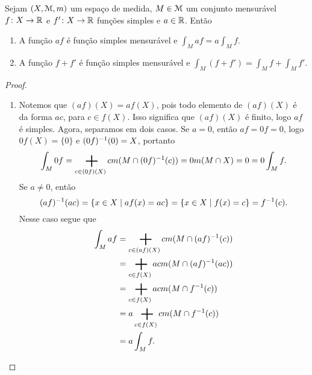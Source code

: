 \begin{proposition}
Sejam $(X,\mathcal{M},m)$ um espaço de medida, $M \in \mathcal{M}$ um conjunto mensurável $f\colon X \to \mathbb{R}$ e $f'\colon X \to \mathbb{R}$ funções simples e $a \in \mathbb{R}$. Então
	\begin{enumerate}
	\item A função $af$ é função simples mensurável e $\displaystyle\int_M af = a\int_M f$.
	\item A função $f+f'$ é função simples mensurável e $\displaystyle\int_M (f+f') = \int_M f + \int_M f'$.
	\end{enumerate}
\end{proposition}
\begin{proof}
\begin{enumerate}
	\item Notemos que $(af)(X) = af(X)$, pois todo elemento de $(af)(X)$ é da forma $ac$, para $c \in f(X)$. Isso significa que $(af)(X)$ é finito, logo $af$ é simples. Agora, separamos em dois casos. Se $a=0$, então $af=0f=0$, logo $0f(X)=\{0\}$ e $(0f)^{-1}(0)=X$, portanto
	\begin{equation*}
	\int_M 0f = \sum_{c \in (0f)(X)} c \med(M \cap (0f)\inv(c)) = 0 \med(M \cap X) = 0 = 0\int_M f.
	\end{equation*}
Se $a \neq 0$, então
	\begin{equation*}
	(af)^{-1}(ac) = \left\{{x \in X}\;\middle\vert\;{af(x)=ac}\right\} = \left\{{x \in X}\;\middle\vert\;{f(x)=c}\right\} = f^{-1}(c).
	\end{equation*}
	Nesse caso segue que
	\begin{align*}
	\int_M af &= \sum_{c \in (af)(X)} c \med(M \cap (af)\inv(c)) \\
		&= \sum_{c \in f(X)} ac \med(M \cap (af)\inv(ac)) \\
		&= \sum_{c \in f(X)} ac \med(M \cap f\inv(c)) \\
		&= a\sum_{c \in f(X)} c \med(M \cap f\inv(c)) \\
		&= a\int_M f.
	\end{align*}


\end{enumerate}
\end{proof}
